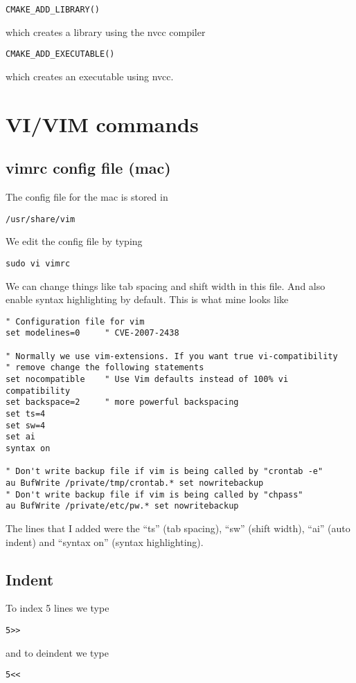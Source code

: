 \documentclass[a4paper, 10pt]{article}
\begin{document}
\begin{verbatim}
CMAKE_ADD_LIBRARY()
\end{verbatim}
which creates a library using the nvcc compiler

\begin{verbatim}
CMAKE_ADD_EXECUTABLE()
\end{verbatim}
which creates an executable using nvcc.
\section*{VI/VIM commands}

\subsection*{vimrc config file (mac)}

The config file for the mac is stored in 
\begin{verbatim}
/usr/share/vim
\end{verbatim}
We edit the config file by typing
\begin{verbatim}
sudo vi vimrc
\end{verbatim}

We can change things like tab spacing and shift width in this file. And also enable syntax highlighting by default. This is what mine looks like
\begin{verbatim}
" Configuration file for vim
set modelines=0     " CVE-2007-2438

" Normally we use vim-extensions. If you want true vi-compatibility
" remove change the following statements
set nocompatible    " Use Vim defaults instead of 100% vi compatibility
set backspace=2     " more powerful backspacing
set ts=4
set sw=4
set ai
syntax on

" Don't write backup file if vim is being called by "crontab -e"
au BufWrite /private/tmp/crontab.* set nowritebackup
" Don't write backup file if vim is being called by "chpass"
au BufWrite /private/etc/pw.* set nowritebackup
\end{verbatim}
The lines that I added were the ``ts'' (tab spacing), ``sw'' (shift width), ``ai'' (auto indent) and ``syntax on'' (syntax highlighting).
 
\subsection*{Indent}
To index 5 lines we type
\begin{verbatim}
5>>
 \end{verbatim}
and to deindent we type
\begin{verbatim}
5<<
 \end{verbatim}
\end{document}
